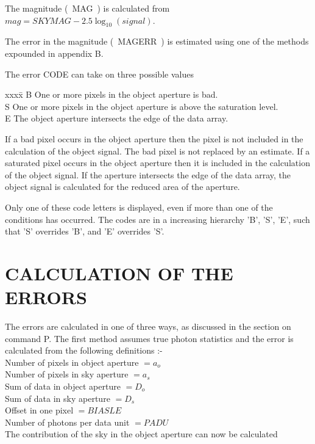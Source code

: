 The magnitude (~MAG~) is calculated from
$mag = SKYMAG - 2.5 \log_{10} ( signal )$.

The error in the magnitude (~MAGERR~) is estimated using one of the
methods expounded in appendix B.

The error CODE can take on three possible values
\begin{tabbing}
xxxx\=\kill
B \> One or more pixels in the object aperture is bad.\\
S \> One or more pixels in the object aperture is above the saturation level.\\
E \> The object aperture intersects the edge of the data array.\\
\end{tabbing}

If a bad pixel occurs in the object aperture then the pixel is not
included in the calculation of the object signal. The bad pixel is not
replaced by an estimate. If a saturated pixel occurs in the object
aperture then it is included in the calculation of the object signal. 
If the aperture intersects the edge of the data array, the object signal
is calculated for the reduced area of the aperture.

Only one of these code letters is displayed, even if more than one of the
conditions has occurred. The codes are in a increasing hierarchy 'B', 'S',
'E', such that 'S' overrides 'B', and 'E' overrides 'S'.

\newpage
\section{CALCULATION OF THE ERRORS}

The errors are calculated in one of three ways, as discussed in the section
on command P. The first method assumes true photon statistics and the
error is calculated from the following definitions :-\\

Number of pixels in object aperture  $= a_o$\\
Number of pixels in sky aperture     $= a_s$\\
Sum of data in object aperture       $= D_o$\\
Sum of data in sky aperture          $= D_s$\\
Offset in one pixel                  $= BIASLE$\\
Number of photons per data unit      $= PADU$\\

The contribution of the sky in the object aperture can now be calculated\\


